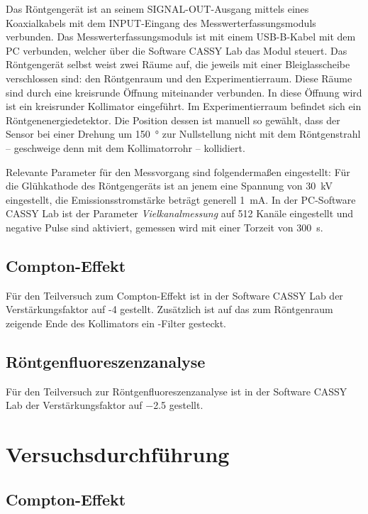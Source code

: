 \documentclass[ngerman]{scrartcl}
\begin{document}
Das Röntgengerät ist an seinem SIGNAL-OUT-Ausgang mittels eines Koaxialkabels mit dem INPUT-Eingang des Messwerterfassungsmoduls verbunden. Das Messwerterfassungsmoduls ist mit einem USB-B-Kabel mit dem PC verbunden, welcher über die Software CASSY Lab das Modul steuert. Das Röntgengerät selbst weist zwei Räume auf, die jeweils mit einer Bleiglasscheibe verschlossen sind: den Röntgenraum und den Experimentierraum. Diese Räume sind durch eine kreisrunde Öffnung miteinander verbunden. In diese Öffnung wird ist ein kreisrunder Kollimator eingeführt. Im Experimentierraum befindet sich ein Röntgenenergiedetektor. Die Position dessen ist manuell so gewählt, dass der Sensor bei einer Drehung um \SI{150}{\degree} zur Nullstellung nicht mit dem Röntgenstrahl -- geschweige denn mit dem Kollimatorrohr -- kollidiert.

Relevante Parameter für den Messvorgang sind folgendermaßen eingestellt: Für die Glühkathode des Röntgengeräts ist an jenem eine Spannung von \SI{30}{kV} eingestellt, die Emissionsstromstärke beträgt generell \SI{1}{mA}. In der PC-Software CASSY Lab ist der Parameter \textit{Vielkanalmessung} auf 512 Kanäle eingestellt und negative Pulse sind aktiviert, gemessen wird mit einer Torzeit von \SI{300}{s}.


\subsection{Compton-Effekt}
\label{subsec:aufbau_compton}

Für den Teilversuch zum Compton-Effekt ist in der Software CASSY Lab der Verstärkungsfaktor auf -4 gestellt. Zusätzlich ist auf das zum Röntgenraum zeigende Ende des Kollimators ein -Filter gesteckt.


\subsection{Röntgenfluoreszenzanalyse}
\label{subsec:aufbau_fluoreszenz}

Für den Teilversuch zur Röntgenfluoreszenzanalyse ist in der Software CASSY Lab der Verstärkungsfaktor auf \num{-2.5} gestellt.



\section{Versuchsdurchführung}
\label{sec:durchfuehrung}

\subsection{Compton-Effekt}
\label{subsec:durchfuehrung_compton}
\end{document}
